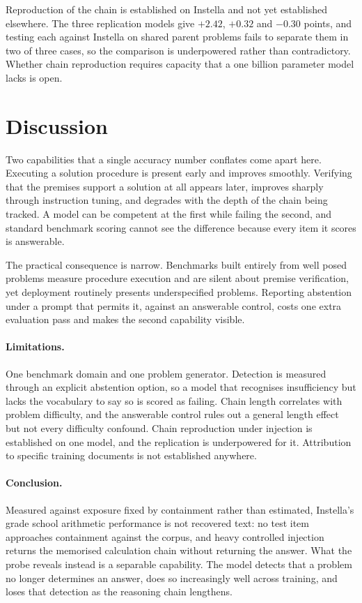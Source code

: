 Reproduction of the chain is established on Instella and not yet established elsewhere. The
three replication models give $+2.42$, $+0.32$ and $-0.30$ points, and testing each against
Instella on shared parent problems fails to separate them in two of three cases, so the
comparison is underpowered rather than contradictory. Whether chain reproduction requires
capacity that a one billion parameter model lacks is open.

\section{Discussion}

Two capabilities that a single accuracy number conflates come apart here. Executing a
solution procedure is present early and improves smoothly. Verifying that the premises
support a solution at all appears later, improves sharply through instruction tuning, and
degrades with the depth of the chain being tracked. A model can be competent at the first
while failing the second, and standard benchmark scoring cannot see the difference because
every item it scores is answerable.

The practical consequence is narrow. Benchmarks built entirely from well posed problems
measure procedure execution and are silent about premise verification, yet deployment
routinely presents underspecified problems. Reporting abstention under a prompt that permits
it, against an answerable control, costs one extra evaluation pass and makes the second
capability visible.

\paragraph{Limitations.} One benchmark domain and one problem generator. Detection is
measured through an explicit abstention option, so a model that recognises insufficiency but
lacks the vocabulary to say so is scored as failing. Chain length correlates with problem
difficulty, and the answerable control rules out a general length effect but not every
difficulty confound. Chain reproduction under injection is established on one model, and the
replication is underpowered for it. Attribution to specific training documents is not
established anywhere.

\paragraph{Conclusion.} Measured against exposure fixed by containment rather than
estimated, Instella's grade school arithmetic performance is not recovered text: no test item
approaches containment against the corpus, and heavy controlled injection returns the
memorised calculation chain without returning the answer. What the probe reveals instead is a
separable capability. The model detects that a problem no longer determines an answer, does
so increasingly well across training, and loses that detection as the reasoning chain
lengthens.
